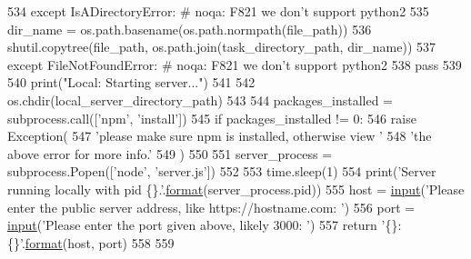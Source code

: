 \begin{DoxyCode}
534         \textcolor{keywordflow}{except} IsADirectoryError:  \textcolor{comment}{# noqa: F821 we don't support python2}
535             dir\_name = os.path.basename(os.path.normpath(file\_path))
536             shutil.copytree(file\_path, os.path.join(task\_directory\_path, dir\_name))
537         \textcolor{keywordflow}{except} FileNotFoundError:  \textcolor{comment}{# noqa: F821 we don't support python2}
538             \textcolor{keywordflow}{pass}
539 
540     print(\textcolor{stringliteral}{"Local: Starting server..."})
541 
542     os.chdir(local\_server\_directory\_path)
543 
544     packages\_installed = subprocess.call([\textcolor{stringliteral}{'npm'}, \textcolor{stringliteral}{'install'}])
545     \textcolor{keywordflow}{if} packages\_installed != 0:
546         \textcolor{keywordflow}{raise} Exception(
547             \textcolor{stringliteral}{'please make sure npm is installed, otherwise view '}
548             \textcolor{stringliteral}{'the above error for more info.'}
549         )
550 
551     server\_process = subprocess.Popen([\textcolor{stringliteral}{'node'}, \textcolor{stringliteral}{'server.js'}])
552 
553     time.sleep(1)
554     print(\textcolor{stringliteral}{'Server running locally with pid \{\}.'}.\hyperlink{namespaceparlai_1_1chat__service_1_1services_1_1messenger_1_1shared__utils_a32e2e2022b824fbaf80c747160b52a76}{format}(server\_process.pid))
555     host = \hyperlink{namespaceparlai_1_1mturk_1_1core_1_1dev_1_1test_1_1test__full__system_a1e1817cd65688fb90f827834d1fb4567}{input}(\textcolor{stringliteral}{'Please enter the public server address, like https://hostname.com: '})
556     port = \hyperlink{namespaceparlai_1_1mturk_1_1core_1_1dev_1_1test_1_1test__full__system_a1e1817cd65688fb90f827834d1fb4567}{input}(\textcolor{stringliteral}{'Please enter the port given above, likely 3000: '})
557     \textcolor{keywordflow}{return} \textcolor{stringliteral}{'\{\}:\{\}'}.\hyperlink{namespaceparlai_1_1chat__service_1_1services_1_1messenger_1_1shared__utils_a32e2e2022b824fbaf80c747160b52a76}{format}(host, port)
558 
559 
\end{DoxyCode}
\mbox{\label{namespaceparlai_1_1mturk_1_1core_1_1server__utils_a154e8cbb18375ff8fd6730154d312bbc}} 
